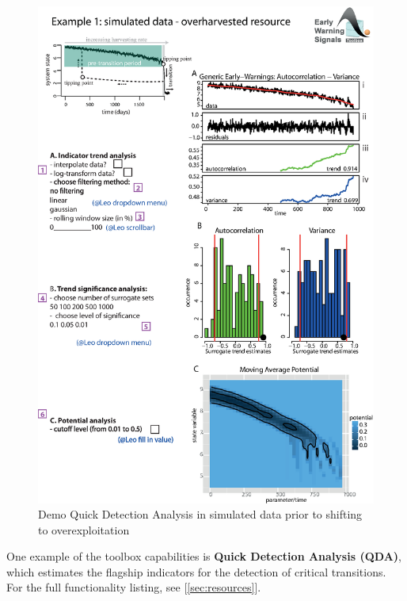 \documentclass[12pt,a4paper,final]{article}
\begin{document}
\begin{figure}[ht]
\begin{center}
\includegraphics[scale=0.8]{fig_2_simulated_970pts.eps}
\caption{Demo Quick Detection Analysis in simulated data prior to shifting to overexploitation}
\end{center}
\label{fig:simulatedQDA}
\end{figure}

One example of the toolbox capabilities is \textbf{Quick Detection Analysis (QDA)}, which estimates the flagship indicators for the detection of critical transitions. For the full functionality listing, see [\ref{sec:resources}].\\
 
\end{document}
